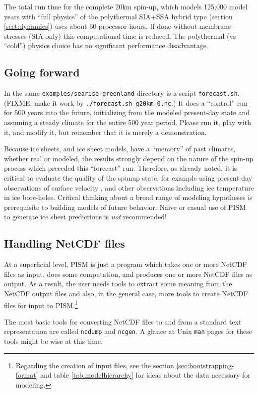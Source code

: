 The total run time for the complete 20km spin-up, which models 125,000 model years with ``full physics'' of the polythermal SIA+SSA hybrid type (section \ref{sect:dynamics}) uses about 60 processor-hours.  If done without membrane stresses (SIA only) this computational time is reduced.  The polythermal (vs ``cold'') physics choice has no significant performance disadvantage.


\subsection{Going forward}  \label{subsect:forecastcaution}  In the same \verb|examples/searise-greenland| directory is a script \verb|forecast.sh|.  (FIXME: make it work by \verb|./forecast.sh g20km_0.nc|.)  It does a ``control'' run for 500 years into the future, initializing from the modeled present-day state and assuming a steady climate for the entire 500 year period.  Please run it, play with it, and modify it, but remember that it is merely a demonstration.

Because ice sheets, and ice sheet models, have a ``memory'' of past climates, whether real or modeled, the results strongly depend on the nature of the spin-up process which preceded this ``forecast'' run.  Therefore, as already noted, it is critical to evaluate the quality of the spunup state, for example using present-day observations of surface velocity \cite{BKAJS}, and other observations including ice temperature in ice bore-holes.  Critical thinking about a broad range of modeling hypotheses is prerequisite to building models of future behavior.  Naive or casual use of PISM to generate ice sheet predictions is \emph{not} recommended!


\subsection{Handling NetCDF files}\label{subsect:nctoolsintro}  At a superficial level, PISM is just a program which takes one or more NetCDF files as input, does some computation, and produces one or more NetCDF files as output.  As a result, the user needs tools to extract some meaning from the NetCDF output files and also, in the general case, more tools to create NetCDF files for input to PISM.\footnote{Regarding the creation of input files, see the section \ref{sec:bootstrapping-format} and table \ref{tab:modelhierarchy} for ideas about the data necessary for modeling.}

The most basic tools for converting NetCDF files to and from a standard text representation are called \texttt{ncdump} and \texttt{ncgen}.  A glance at Unix \texttt{man} pages for these tools might be wise at this time.

